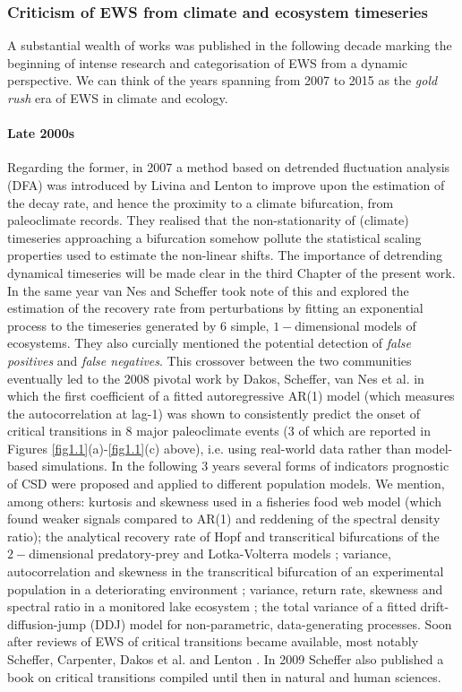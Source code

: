 \documentclass[../main.tex]{subfiles}
\begin{document}
\subsubsection{Criticism of EWS from climate and ecosystem timeseries}\label{subsubsec1.2.2}
A substantial wealth of works was published in the following decade marking the beginning of intense research and categorisation of EWS from a dynamic perspective. 
We can think of the years spanning from 2007 to 2015 as the \textit{gold rush} era of EWS in climate and ecology.
\paragraph{Late 2000s}
Regarding the former, in 2007 a method based on detrended fluctuation analysis (DFA) was introduced by Livina and Lenton \cite{Livina07} to improve upon the estimation of the decay rate, and hence the proximity to a climate bifurcation, from paleoclimate records. 
They realised that the non-stationarity of (climate) timeseries approaching a bifurcation somehow pollute the statistical scaling properties used to estimate the non-linear shifts. 
The importance of detrending dynamical timeseries will be made clear in the third Chapter of the present work.
In the same year van Nes and Scheffer \cite{vanNes07} took note of this and explored the estimation of the recovery rate from perturbations by fitting an exponential process to the timeseries generated by $6$ simple, $1-$dimensional models of ecosystems. 
They also curcially mentioned the potential detection of \textit{false positives} and \textit{false negatives}.
This crossover between the two communities eventually led to the 2008 pivotal work by Dakos, Scheffer, van Nes et al. \cite{Dakos08} in which the first coefficient of a fitted autoregressive AR(1) model (which measures the autocorrelation at lag-1) was shown to consistently predict the onset of critical transitions in $8$ major paleoclimate events ($3$ of which are reported in Figures \ref{fig1.1}(a)-\ref{fig1.1}(c) above), i.e. using real-world data rather than model-based simulations.
In the following 3 years several forms of indicators prognostic of CSD were proposed and applied to different population models. 
We mention, among others: kurtosis and skewness \cite{Biggs09} used in a fisheries food web model (which found weaker signals compared to AR(1) and reddening of the spectral density ratio); the analytical recovery rate of Hopf and transcritical bifurcations of the $2-$dimensional predatory-prey and Lotka-Volterra models \cite{Chisholm09}; variance, autocorrelation and skewness in the transcritical bifurcation of an experimental population in a deteriorating environment \cite{Drake10}; variance, return rate, skewness and spectral ratio in a monitored lake ecosystem \cite{Carpenter11a}; the total variance of a fitted drift-diffusion-jump (DDJ) model \cite{Carpenter11b} for non-parametric, data-generating processes.
Soon after reviews of EWS of critical transitions became available, most notably Scheffer, Carpenter, Dakos et al. \cite{Scheffer09} and Lenton \cite{Lenton11}. In 2009 Scheffer also published a book \cite{Scheffer09b} on critical transitions compiled until then in natural and human sciences.
\end{document}
